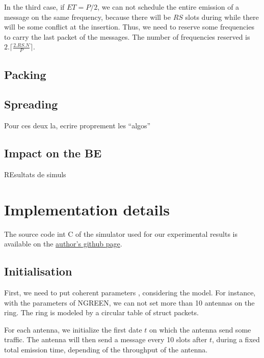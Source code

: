 \documentclass[a4paper,10pt]{article}
\begin{document}
In the third case, if $ET = P/2$, we can not schedule the entire emission of a message on the same frequency, because there will be $RS$ slots during while there will be some conflict at the insertion.
Thus, we need to reserve some frequencies to carry the last packet of the messages.
The number of frequencies reserved is $2 .\lceil \frac{2.RS.N}{P}\rceil$.

	

  \subsection{Packing}
  \subsection{Spreading}
  Pour ces deux la, ecrire proprement les ``algos''
  \subsection{Impact on the BE}
  REsultats de simuls
  
  
\section{ Implementation details}

	The source code int C of the simulator used for our experimental results is available on the \href{https://github.com/Mael-Guiraud/Ngreen.git}{ author's github page}.
	\subsection{Initialisation}
	First, we need to put coherent parameters , considering the model. For instance, with the parameters of NGREEN, we can not set more than 10 antennas on the ring. 
	The ring is modeled by a circular table of struct packets. 
	
	\begin{algorithm}[H]
	\end{algorithm}
	
	For each antenna, we initialize the first date $t$ on which the antenna send some traffic. The antenna will then send a message every 10 slots after $t$, during a fixed total emission time, depending of the throughput of the antenna.
\end{document}
